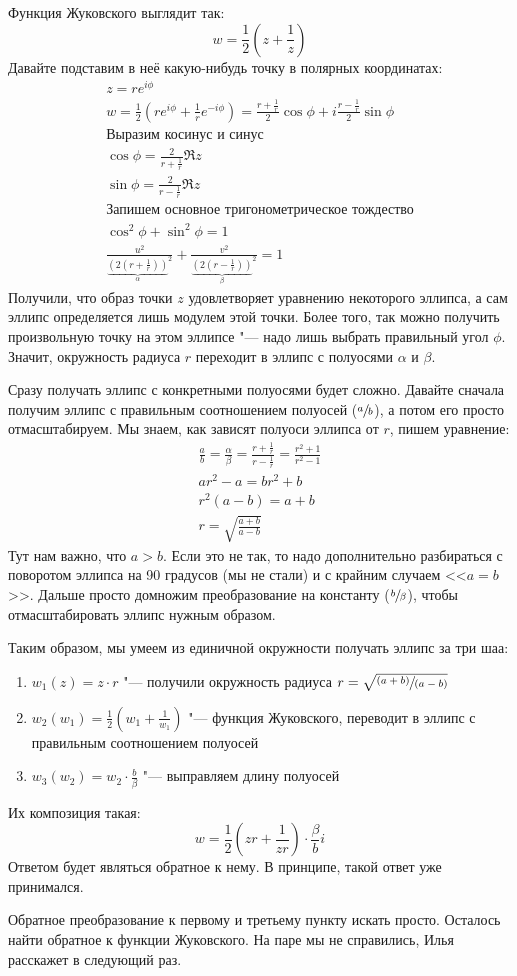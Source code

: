 	Функция Жуковского выглядит так:
	\[
		w = \frac12\left(z+\frac1z\right)
	\]
	Давайте подставим в неё какую-нибудь точку в полярных координатах:
	\begin{gather*}
		z=re^{i\phi} \\
		w=\frac12\left(re^{i\phi}+\frac1r e^{-i\phi}\right)=
		\frac{r+\frac1r}{2}\cos\phi + i\frac{r-\frac1r}{2}\sin\phi \\
		\text{Выразим косинус и синус} \\
		\cos\phi = \frac{2}{r+\frac1r}\Re z \\
		\sin\phi = \frac{2}{r-\frac1r}\Re z \\
		\text{Запишем основное тригонометрическое тождество} \\
		\cos^2\phi + \sin^2\phi = 1 \\
		\frac{u^2}{{\underbrace{\left(2\left(r+\frac1r\right)\right)}_{\alpha}}^2} +
		\frac{v^2}{{\underbrace{\left(2\left(r-\frac1r\right)\right)}_{\beta}}^2} = 1
	\end{gather*}
	Получили, что образ точки $z$ удовлетворяет уравнению некоторого эллипса, а сам эллипс определяется лишь модулем этой точки.
	Более того, так можно получить произвольную точку на этом эллипсе "--- надо лишь выбрать правильный угол $\phi$.
	Значит, окружность радиуса $r$ переходит в эллипс с полуосями $\alpha$ и $\beta$.

	Сразу получать эллипс с конкретными полуосями будет сложно.
	Давайте сначала получим эллипс с правильным соотношением полуосей ($\sfrac{a}{b}$), а потом его просто отмасштабируем.
	Мы знаем, как зависят полуоси эллипса от $r$, пишем уравнение:
	\begin{gather*}
		\frac{a}{b} = \frac{\alpha}{\beta} = \frac{r+\frac1r}{r-\frac1r} = \frac{r^2+1}{r^2-1} \\
		ar^2-a = br^2+b \\
		r^2(a-b) = a+b \\
		r = \sqrt{\frac{a+b}{a-b}}
	\end{gather*}
	Тут нам важно, что $a>b$.
	Если это не так, то надо дополнительно разбираться с поворотом эллипса на 90 градусов (мы не стали) и с крайним случаем <<$a=b$>>.
	Дальше просто домножим преобразование на константу ($\sfrac{b}{\beta}$), чтобы отмасштабировать эллипс нужным образом.

	Таким образом, мы умеем из единичной окружности получать эллипс за три шаа:
	\begin{enumerate}
		\item $w_1(z) = z \cdot r$ "--- получили окружность радиуса $r=\sqrt{\sfrac{(a+b)}{(a-b)}}$
		\item $w_2(w_1) = \frac12\left(w_1+\frac1{w_1}\right)$ "--- функция Жуковского, переводит в эллипс с правильным соотношением полуосей
		\item $w_3(w_2) = w_2 \cdot \frac{b}{\beta}$ "--- выправляем длину полуосей
	\end{enumerate}
	Их композиция такая:
	\[
		w=\frac12\left(zr+\frac{1}{zr}\right)\cdot\frac{\beta}{b}i
	\]
	Ответом будет являться обратное к нему.
	В принципе, такой ответ уже принимался.

	Обратное преобразование к первому и третьему пункту искать просто.
	Осталось найти обратное к функции Жуковского.
	На паре мы не справились, Илья расскажет в следующий раз.
